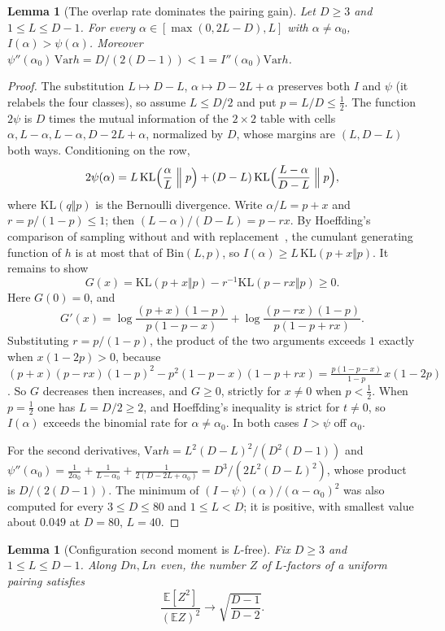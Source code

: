 \documentclass[11pt]{article}
\newtheorem{lemma}[theorem]{Lemma}
\newcommand{\EE}{\mathbb{E}}
\newcommand{\Var}{\mathrm{Var}}
\begin{document}
\begin{lemma}[The overlap rate dominates the pairing gain]
\label{lem:factor-rate}
Let \(D\ge3\) and \(1\le L\le D-1\). For every
\(\alpha\in[\max(0,2L-D),L]\) with \(\alpha\ne\alpha_0\),
\(I(\alpha)>\psi(\alpha)\). Moreover
\(\psi''(\alpha_0)\,\Var h=D/(2(D-1))<1=I''(\alpha_0)\Var h\).
\end{lemma}

\begin{proof}
The substitution \(L\mapsto D-L\), \(\alpha\mapsto D-2L+\alpha\) preserves both
\(I\) and \(\psi\) (it relabels the four classes), so assume \(L\le D/2\) and
put \(p=L/D\le\tfrac12\). The function \(2\psi\) is \(D\) times the mutual
information of the \(2\times2\) table with cells
\(\alpha,L-\alpha,L-\alpha,D-2L+\alpha\), normalized by \(D\), whose margins are
\((L,D-L)\) both ways. Conditioning on the row,
\[
2\psi(\alpha)
=
L\,\mathrm{KL}\Bigl(\frac{\alpha}{L}\Bigm\Vert p\Bigr)
+(D-L)\,\mathrm{KL}\Bigl(\frac{L-\alpha}{D-L}\Bigm\Vert p\Bigr),
\]
where \(\mathrm{KL}(q\Vert p)\) is the Bernoulli divergence. Write
\(\alpha/L=p+x\) and \(r=p/(1-p)\le1\); then
\((L-\alpha)/(D-L)=p-rx\). By Hoeffding's comparison of sampling without and
with replacement~\cite{Hoeffding63}, the cumulant generating function of \(h\)
is at most that of \(\mathrm{Bin}(L,p)\), so
\(I(\alpha)\ge L\,\mathrm{KL}(p+x\Vert p)\). It remains to show
\[
G(x)=\mathrm{KL}(p+x\Vert p)-r^{-1}\mathrm{KL}(p-rx\Vert p)\ge0 .
\]
Here \(G(0)=0\), and
\[
G'(x)=\log\frac{(p+x)(1-p)}{p(1-p-x)}+\log\frac{(p-rx)(1-p)}{p(1-p+rx)}.
\]
Substituting \(r=p/(1-p)\), the product of the two arguments exceeds \(1\)
exactly when \(x(1-2p)>0\), because
\((p+x)(p-rx)(1-p)^2-p^2(1-p-x)(1-p+rx)
=\frac{p(1-p-x)}{1-p}\,x(1-2p)\).
So \(G\) decreases then increases, and \(G\ge0\), strictly for \(x\ne0\) when
\(p<\tfrac12\). When \(p=\tfrac12\) one has \(L=D/2\ge2\), and Hoeffding's
inequality is strict for \(t\ne0\), so \(I(\alpha)\) exceeds the binomial rate
for \(\alpha\ne\alpha_0\). In both cases \(I>\psi\) off \(\alpha_0\).

For the second derivatives, \(\Var h=L^2(D-L)^2/(D^2(D-1))\) and
\(\psi''(\alpha_0)=\frac1{2\alpha_0}+\frac1{L-\alpha_0}+\frac1{2(D-2L+\alpha_0)}
=D^3/(2L^2(D-L)^2)\), whose product is \(D/(2(D-1))\).
The minimum of \((I-\psi)(\alpha)/(\alpha-\alpha_0)^2\) was also computed for
every \(3\le D\le80\) and \(1\le L<D\); it is positive, with smallest value
about \(0.049\) at \(D=80\), \(L=40\).
\end{proof}

\begin{lemma}[Configuration second moment is \(L\)-free]
\label{lem:factor-config}
Fix \(D\ge3\) and \(1\le L\le D-1\). Along \(Dn,Ln\) even, the number \(Z\) of
\(L\)-factors of a uniform pairing satisfies
\[
\frac{\EE[Z^2]}{(\EE Z)^2}\to\sqrt{\frac{D-1}{D-2}} .
\]
\end{lemma}
\end{document}
